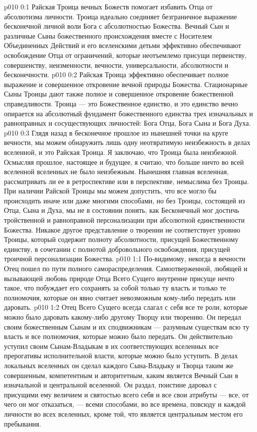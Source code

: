 \author{Вселенский Цензор}
\vs p010 0:1 Райская Троица вечных Божеств помогает избавить Отца от абсолютизма личности. Троица идеально соединяет безграничное выражение бесконечной личной воли Бога с абсолютностью Божества. Вечный Сын и различные Сыны божественного происхождения вместе с Носителем Объединенных Действий и его вселенскими детьми эффективно обеспечивают освобождение Отца от ограничений, которые неотъемлемо присущи первенству, совершенству, неизменности, вечности, универсальности, абсолютности и бесконечности.
\vs p010 0:2 Райская Троица эффективно обеспечивает полное выражение и совершенное откровение вечной природы Божества. Стационарные Сыны Троицы дают также полное и совершенное откровение божественной справедливости. Троица --- это Божественное единство, и это единство вечно опирается на абсолютный фундамент божественного единства трех изначальных и равноправных и сосуществующих личностей: Бога Отца, Бога Сына и Бога Духа.
\vs p010 0:3 \pc Глядя назад в бесконечное прошлое из нынешней точки на круге вечности, мы можем обнаружить лишь одну неотвратимую неизбежность в делах вселенной, и это Райская Троица. Я заключаю, что Троица была неизбежной. Осмысляя прошлое, настоящее и будущее, я считаю, что больше ничто во всей вселенной вселенных не было неизбежным. Нынешняя главная вселенная, рассматривать ли ее в ретроспективе или в перспективе, немыслима без Троицы. При наличии Райской Троицы мы можем допустить, что все могло бы происходить иначе или даже многими способами, но без Троицы, состоящей из Отца, Сына и Духа, мы не в состоянии понять, как Бесконечный мог достичь тройственной и равноправной персонализации при абсолютной единственности Божества. Никакое другое представление о творении не соответствует уровню Троицы, который содержит полноту абсолютности, присущей Божественному единству, в сочетании с полнотой добровольного освобождения, присущей троичной персонализации Божества.
\vs p010 1:1 По\hyp{}видимому, некогда в вечности Отец пошел по пути полного самораспределения. Самоотверженной, любящей и вызывающей любовь природе Отца Всего Сущего внутренне присуще нечто такое, что побуждает его сохранять за собой только ту власть и только те полномочия, которые он явно считает невозможным кому\hyp{}либо передать или даровать.
\vs p010 1:2 Отец Всего Сущего всегда слагал с себя все те роли, которые можно было даровать какому\hyp{}либо другому Творцу или творению. Он передал своим божественным Сынам и их сподвижникам --- разумным существам всю ту власть и все полномочия, которые можно было передать. Он действительно уступил своим Сынам\hyp{}Владыкам в их соответствующих вселенных все прерогативы исполнительной власти, которые можно было уступить. В делах локальных вселенных он сделал каждого Сына\hyp{}Владыку и Творца таким же совершенным, компетентным и авторитетным, каким является Вечный Сын в изначальной и центральной вселенной. Он раздал, поистине даровал с присущими ему величием и святостью всего себя и все свои атрибуты --- все, от чего он мог отказаться, --- всеми способами, во все времена, повсюду и каждой личности во всех вселенных, кроме той, что является центральным местом его пребывания.
